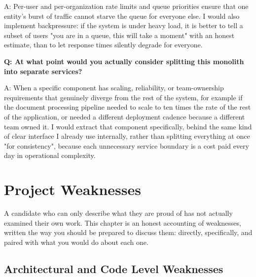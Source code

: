 \documentclass[11pt,a4paper]{report}
\begin{document}
\begin{qabox}
A: Per-user and per-organization rate limits and queue priorities ensure that one entity's burst of traffic cannot starve the queue for everyone else. I would also implement backpressure: if the system is under heavy load, it is better to tell a subset of users "you are in a queue, this will take a moment" with an honest estimate, than to let response times silently degrade for everyone.

\textbf{Q: At what point would you actually consider splitting this monolith into separate services?}

A: When a specific component has scaling, reliability, or team-ownership requirements that genuinely diverge from the rest of the system, for example if the document processing pipeline needed to scale to ten times the rate of the rest of the application, or needed a different deployment cadence because a different team owned it. I would extract that component specifically, behind the same kind of clear interface I already use internally, rather than splitting everything at once "for consistency", because each unnecessary service boundary is a cost paid every day in operational complexity.
\end{qabox}

\chapter{Project Weaknesses}

A candidate who can only describe what they are proud of has not actually examined their own work. This chapter is an honest accounting of weaknesses, written the way you should be prepared to discuss them: directly, specifically, and paired with what you would do about each one.

\section{Architectural and Code Level Weaknesses}
\end{document}
